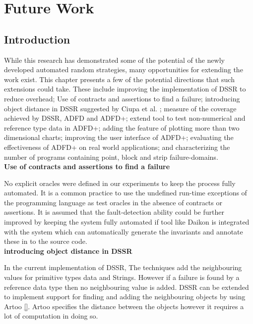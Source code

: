 
\chapter{Future Work}
\label{chap:futureWork}

\section{Introduction}\label{sec:intro8}
	
While this research has demonstrated some of the potential of the newly developed automated random strategies, many opportunities for extending the work exist. This chapter presents a few of the potential directions that such extensions could take. These include improving the implementation of DSSR to reduce overhead; Use of contracts and assertions to find a failure; introducing object distance in DSSR suggested by Ciupa et al. \cite{ciupa2006object}; measure of the coverage achieved by DSSR, ADFD and ADFD+; extend tool to test non-numerical and reference type data in ADFD+; adding the feature of plotting more than two dimensional charts; improving the user interface of ADFD+; evaluating the effectiveness of ADFD+ on real world applications; and characterizing the number of programs containing point, block and strip failure-domains.\\
	
\textbf{Use of contracts and assertions to find a failure}

No explicit oracles were defined in our experiments to keep the process fully automated. It is a common practice to use the undefined run-time exceptions of the programming language as test oracles in the absence of contracts or assertions. It is assumed that the fault-detection ability could be further improved by keeping the system fully automated if tool like Daikon is integrated with the system which can automatically generate the invariants and annotate these in to the source code.\\

\textbf{introducing object distance in DSSR}

In the current implementation of DSSR, The techniques add the neighbouring values for primitive types data and Strings. However if a failure is found by a reference data type then no neighbouring value is added. DSSR can be extended to implement support for finding and adding the neighbouring objects by using Artoo \ref{}. Artoo specifies the distance between the objects however it requires a lot of computation in doing so.  \\


